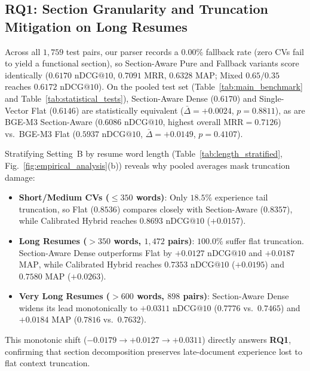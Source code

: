 


\subsection{RQ1: Section Granularity and Truncation Mitigation on Long Resumes}
\label{sec:rq1}
Across all $1{,}759$ test pairs, our parser records a $\mathbf{0.00\%}$ fallback rate (zero CVs fail to yield a functional section), so Section-Aware Pure and Fallback variants score identically ($0.6170$ $\text{nDCG}@10$, $0.7091$ $\text{MRR}$, $0.6328$ $\text{MAP}$; Mixed $0.65/0.35$ reaches $0.6172$ $\text{nDCG}@10$). On the pooled test set (Table~\ref{tab:main_benchmark} and Table~\ref{tab:statistical_tests}), Section-Aware Dense ($0.6170$) and Single-Vector Flat ($0.6146$) are statistically equivalent ($\bar{\Delta}=+0.0024$, $p=0.8811$), as are BGE-M3 Section-Aware ($0.6086$ $\text{nDCG}@10$, highest overall $\text{MRR}=0.7126$) vs.\ BGE-M3 Flat ($0.5937$ $\text{nDCG}@10$, $\bar{\Delta}=+0.0149$, $p=0.4107$).



Stratifying Setting~B by resume word length (Table~\ref{tab:length_stratified}, Fig.~\ref{fig:empirical_analysis}(b)) reveals why pooled averages mask truncation damage:
\begin{itemize}
    \item \textbf{Short/Medium CVs ($\le 350$ words)}: Only $18.5\%$ experience tail truncation, so Flat ($0.8536$) compares closely with Section-Aware ($0.8357$), while Calibrated Hybrid reaches $\mathbf{0.8693}$ $\text{nDCG}@10$ ($+0.0157$).
    \item \textbf{Long Resumes ($> 350$ words, $1{,}472$ pairs)}: $100.0\%$ suffer flat truncation. Section-Aware Dense outperforms Flat by $+0.0127$ $\text{nDCG}@10$ and $+0.0187$ $\text{MAP}$, while Calibrated Hybrid reaches $\mathbf{0.7353}$ $\text{nDCG}@10$ ($\mathbf{+0.0195}$) and $\mathbf{0.7580}$ $\text{MAP}$ ($\mathbf{+0.0263}$).
    \item \textbf{Very Long Resumes ($> 600$ words, $898$ pairs)}: Section-Aware Dense widens its lead monotonically to $\mathbf{+0.0311}$ $\text{nDCG}@10$ ($0.7776$ vs.\ $0.7465$) and $+0.0184$ $\text{MAP}$ ($0.7816$ vs.\ $0.7632$).
\end{itemize}
This monotonic shift ($-0.0179 \rightarrow +0.0127 \rightarrow +0.0311$) directly answers \textbf{RQ1}, confirming that section decomposition preserves late-document experience lost to flat context truncation.

